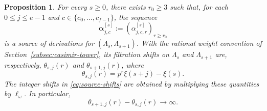 \documentclass[11pt]{article}
\numberwithin{equation}{section}
\newtheorem{proposition}[theorem]{Proposition}
\theoremstyle{definition}
\theoremstyle{remark}
\begin{document}
\begin{proposition}\label{prop:casimir-conjugation-sources}
For every $s\geq0$, there exists $r_0\geq3$ such that, for each
$0\leq j\leq e-1$ and $c\in\{c_0,\ldots,c_{f-1}\}$, the sequence
\[
 \boldsymbol\alpha^{[s]}_{j,c}
   :=(\alpha^{[s]}_{j,c,r})_{r\geq r_0}
\]
is a source of derivations for $(\Lambda_s,\Lambda_{s+1})$.
With the rational weight convention of Section~\ref{subsec:casimir-tower},
its filtration shifts on $\Lambda_s$ and $\Lambda_{s+1}$ are,
respectively, $\theta_{s,j}(r)$ and $\theta_{s+1,j}(r)$, where
\begin{equation}\label{eq:casimir-source-shifts}
 \theta_{s,j}(r)=p^r\xi(s+j)-\xi(s).
\end{equation}
The integer shifts in \eqref{eq:source-shifts} are obtained by
multiplying these quantities by $\ell_\omega$. In particular,
\[
 \theta_{s+1,j}(r)-\theta_{s,j}(r)\longrightarrow\infty.
\]
\end{proposition}
\end{document}
